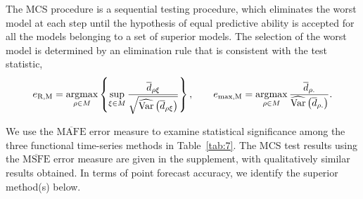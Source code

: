 \documentclass[12pt,a4paper]{article}
\newcommand{\argmax}{\operatornamewithlimits{argmax}}
\begin{document}
The MCS procedure is a sequential testing procedure, which eliminates the worst model at each step until the hypothesis of equal predictive ability is accepted for all the models belonging to a set of superior models. The selection of the worst model is determined by an elimination rule that is consistent with the test statistic, 
\begin{equation*}
e_{\text{R},\text{M}} = \argmax_{\rho\in M}\left\{\sup_{\xi \in M}\frac{\overline{d}_{\rho\xi}}{\sqrt{\widehat{\text{Var}}\left(\overline{d}_{\rho\xi}\right)}}\right\}, \qquad
e_{\max, \text{M}} = \argmax_{\rho\in M}\frac{\overline{d}_{\rho.}}{\widehat{\text{Var}}\left(\overline{d}_{\rho.}\right)}.
\end{equation*} 

We use the $\overline{\text{MAFE}}$ error measure to examine statistical significance among the three functional time-series methods in Table~\ref{tab:7}. The MCS test results using the $\overline{\text{MSFE}}$ error measure are given in the supplement, with qualitatively similar results obtained. In terms of point forecast accuracy, we identify the superior method(s) below.
\end{document}
